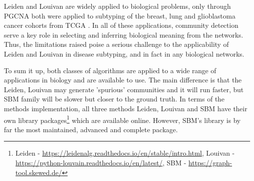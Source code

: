 Leiden and Louivan are widely applied to biological problems, only through PGCNA both were applied to subtyping of the breast, lung and glioblastoma cancer cohorts from TCGA \cite{Tanner2023-wa, Care2019-ij}. In all of these applications, community detection serve a key role in selecting and inferring biological meaning from the networks. Thus, the limitations raised \citet{Peixoto2021-jx,Guimera2004-gv, Peixoto2023-rt} poise a serious challenge to the applicability of Leiden and Louivan in disease subtyping, and in fact in any biological networks. 

To sum it up, both classes of algorithms are applied to a wide range of applications in biology and are available to use. The main difference is that the Leiden, Louivan may generate 'spurious' communities and it will run faster, but SBM family will be slower but closer to the ground truth. In terms of the methods implementation, all three methods Leiden, Louivan and SBM have their own library packages\footnote{Leiden - \url{https://leidenalg.readthedocs.io/en/stable/intro.html}, Louivan - \url{https://python-louvain.readthedocs.io/en/latest/}, SBM - \url{https://graph-tool.skewed.de/}} which are available online. However, SBM's library is by far the most maintained, advanced and complete package.







